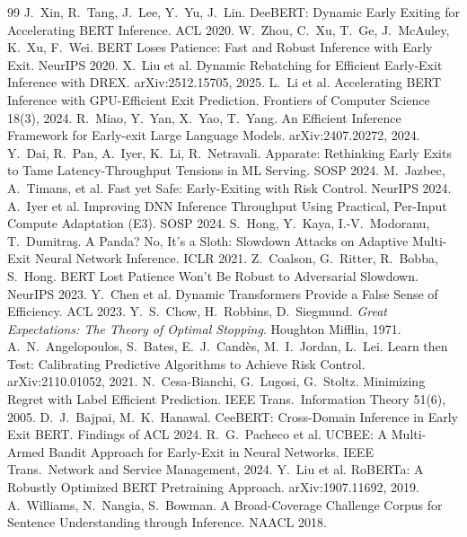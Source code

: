 \begin{thebibliography}{99}\small
{} J.~Xin, R.~Tang, J.~Lee, Y.~Yu, J.~Lin. DeeBERT: Dynamic Early Exiting for Accelerating BERT Inference. ACL 2020.
 W.~Zhou, C.~Xu, T.~Ge, J.~McAuley, K.~Xu, F.~Wei. BERT Loses Patience: Fast and Robust Inference with Early Exit. NeurIPS 2020.
 X.~Liu et al. Dynamic Rebatching for Efficient Early-Exit Inference with DREX. arXiv:2512.15705, 2025.
 L.~Li et al. Accelerating BERT Inference with GPU-Efficient Exit Prediction. Frontiers of Computer Science 18(3), 2024.
 R.~Miao, Y.~Yan, X.~Yao, T.~Yang. An Efficient Inference Framework for Early-exit Large Language Models. arXiv:2407.20272, 2024.
 Y.~Dai, R.~Pan, A.~Iyer, K.~Li, R.~Netravali. Apparate: Rethinking Early Exits to Tame Latency-Throughput Tensions in ML Serving. SOSP 2024.
 M.~Jazbec, A.~Timans, et al. Fast yet Safe: Early-Exiting with Risk Control. NeurIPS 2024.
 A.~Iyer et al. Improving DNN Inference Throughput Using Practical, Per-Input Compute Adaptation (E3). SOSP 2024.
 S.~Hong, Y.~Kaya, I.-V.~Modoranu, T.~Dumitra\c{s}. A Panda? No, It's a Sloth: Slowdown Attacks on Adaptive Multi-Exit Neural Network Inference. ICLR 2021.
 Z.~Coalson, G.~Ritter, R.~Bobba, S.~Hong. BERT Lost Patience Won't Be Robust to Adversarial Slowdown. NeurIPS 2023.
 Y.~Chen et al. Dynamic Transformers Provide a False Sense of Efficiency. ACL 2023.
 Y.~S.~Chow, H.~Robbins, D.~Siegmund. \emph{Great Expectations: The Theory of Optimal Stopping}. Houghton Mifflin, 1971.
 A.~N.~Angelopoulos, S.~Bates, E.~J.~Cand\`es, M.~I.~Jordan, L.~Lei. Learn then Test: Calibrating Predictive Algorithms to Achieve Risk Control. arXiv:2110.01052, 2021.
 N.~Cesa-Bianchi, G.~Lugosi, G.~Stoltz. Minimizing Regret with Label Efficient Prediction. IEEE Trans.\ Information Theory 51(6), 2005.
 D.~J.~Bajpai, M.~K.~Hanawal. CeeBERT: Cross-Domain Inference in Early Exit BERT. Findings of ACL 2024.
 R.~G.~Pacheco et al. UCBEE: A Multi-Armed Bandit Approach for Early-Exit in Neural Networks. IEEE Trans.\ Network and Service Management, 2024.
 Y.~Liu et al. RoBERTa: A Robustly Optimized BERT Pretraining Approach. arXiv:1907.11692, 2019.
 A.~Williams, N.~Nangia, S.~Bowman. A Broad-Coverage Challenge Corpus for Sentence Understanding through Inference. NAACL 2018.

\end{thebibliography}
